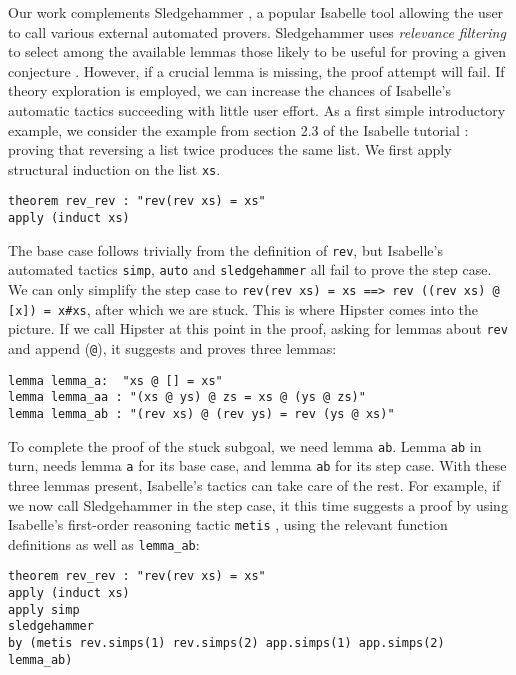 Our work complements Sledgehammer \cite{sledgehammer}, a popular Isabelle tool allowing the user to call various external automated provers. Sledgehammer uses \emph{relevance filtering} to select among the available lemmas those likely to be useful for proving a given conjecture \cite{mash}. However, if a crucial lemma is missing, the proof attempt will fail. If theory exploration is employed, we can increase the chances of Isabelle's automatic tactics succeeding with little user effort. As a first simple introductory example, we consider the example from section 2.3 of the Isabelle tutorial \cite{isabelle}: proving that reversing a list twice produces the same list. We first apply structural induction on the list \texttt{xs}.
\begin{verbatim}
theorem rev_rev : "rev(rev xs) = xs"
apply (induct xs)
\end{verbatim}
The base case follows trivially from the definition of \texttt{rev},
but Isabelle's automated tactics \texttt{simp}, \texttt{auto} and
\texttt{sledgehammer} all fail to prove the step case. We can
only simplify the step case to \texttt{rev(rev
  xs) = xs ==> rev ((rev xs) @ [x]) = x\#xs}, after which we are stuck.
This is where Hipster comes into the picture. If we call Hipster at
this point in the proof, asking for lemmas about \texttt{rev} and
append (\texttt{@}), it suggests and proves three lemmas:
\begin{verbatim}
lemma lemma_a:  "xs @ [] = xs"
lemma lemma_aa : "(xs @ ys) @ zs = xs @ (ys @ zs)"
lemma lemma_ab : "(rev xs) @ (rev ys) = rev (ys @ xs)"
\end{verbatim}
To complete the proof of the stuck subgoal, we need lemma \texttt{ab}. Lemma \texttt{ab} in turn, needs lemma \texttt{a} for its base case, and lemma \texttt{ab} for its step case. With these three lemmas present, Isabelle's tactics can take care of the rest. For example, if we now call Sledgehammer in the step case, it this time suggests a proof by using Isabelle's first-order reasoning tactic \texttt{metis} \cite{metis}, using the relevant function definitions as well as \texttt{lemma\_ab}:
\begin{small}
\begin{verbatim}
theorem rev_rev : "rev(rev xs) = xs"
apply (induct xs)
apply simp
sledgehammer
by (metis rev.simps(1) rev.simps(2) app.simps(1) app.simps(2) lemma_ab)
\end{verbatim}
\end{small}


